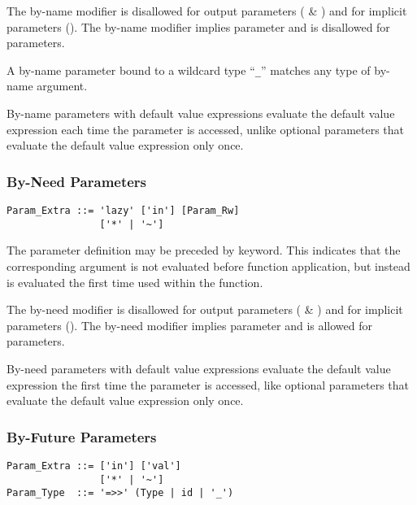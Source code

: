 The by-name modifier is disallowed for output parameters ( \& ) and for implicit parameters (). The by-name modifier implies  parameter and is disallowed for  parameters. 

A by-name parameter bound to a wildcard type ``\lstinline!_!'' matches any type of by-name argument. 

By-name parameters with default value expressions evaluate the default value expression each time the parameter is accessed, unlike optional parameters that evaluate the default value expression only once. 






\subsubsection{By-Need Parameters}
\label{sec:by-need-parameters}

\syntax\begin{lstlisting}
Param_Extra ::= 'lazy' ['in'] [Param_Rw]
                ['*' | '~']
\end{lstlisting}

The parameter definition may be preceded by  keyword. This indicates that the corresponding argument is not evaluated before function application, but instead is evaluated the first time used within the function. 

The by-need modifier is disallowed for output parameters ( \& ) and for implicit parameters (). The by-need modifier implies  parameter and is allowed for  parameters. 

By-need parameters with default value expressions evaluate the default value expression the first time the parameter is accessed, like optional parameters that evaluate the default value expression only once. 






\subsubsection{By-Future Parameters}
\label{sec:by-future-parameters}

\syntax\begin{lstlisting}
Param_Extra ::= ['in'] ['val']
                ['*' | '~']
Param_Type  ::= '=>>' (Type | id | '_')
\end{lstlisting}

